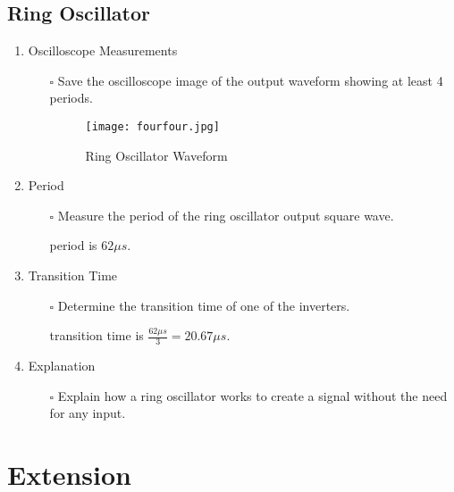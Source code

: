 \documentclass[12pt]{article}
\begin{document}
\subsection{Ring Oscillator}
\begin{enumerate}
\item Oscilloscope Measurements
\begin{itemize}
\item[$\square$] Save the oscilloscope image of the output waveform showing at least 4 periods.

\begin{figure}[h]
    \centering
    \texttt{[image: fourfour.jpg]}
    \caption{Ring Oscillator Waveform}
    \label{fig:Ring-Oscillator-Waveform}
\end{figure}


\end{itemize}
\item Period
\begin{itemize}
\item[$\square$] Measure the period of the ring oscillator output square wave.

period is $62 \mu s$.

\end{itemize}
\item Transition Time
\begin{itemize}
\item[$\square$] Determine the transition time of one of the inverters.

transition time is $\frac{62 \mu s}{3} = 20.67 \mu s$.

\end{itemize}
\item Explanation
\begin{itemize}
\item[$\square$] Explain how a ring oscillator works to create a signal without the need for any input.



\end{itemize}
\end{enumerate}


\section{Extension}
\end{document}
